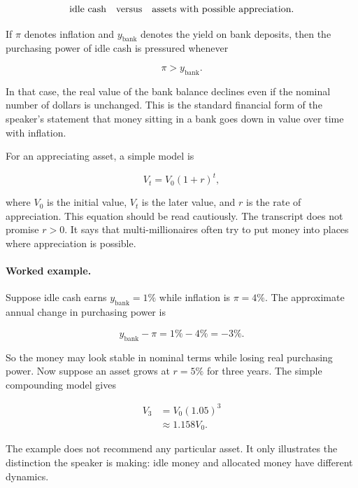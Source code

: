 \begin{equation}
\text{idle cash} \quad \hbox{versus} \quad \text{assets with possible appreciation}.
\end{equation}

If \(\pi\) denotes inflation and \(y_{\text{bank}}\) denotes the yield on bank deposits, then the purchasing power of idle cash is pressured whenever

\begin{equation}
\pi > y_{\text{bank}}.
\end{equation}

In that case, the real value of the bank balance declines even if the nominal number of dollars is unchanged. This is the standard financial form of the speaker's statement that money sitting in a bank goes down in value over time with inflation.

For an appreciating asset, a simple model is

\begin{equation}
V_t=V_0(1+r)^t,
\end{equation}

where \(V_0\) is the initial value, \(V_t\) is the later value, and \(r\) is the rate of appreciation. This equation should be read cautiously. The transcript does not promise \(r>0\). It says that multi-millionaires often try to put money into places where appreciation is possible.

\paragraph{Worked example.}
Suppose idle cash earns \(y_{\text{bank}}=1\%\) while inflation is \(\pi=4\%\). The approximate annual change in purchasing power is

\begin{equation}
y_{\text{bank}}-\pi = 1\%-4\%=-3\%.
\end{equation}

So the money may look stable in nominal terms while losing real purchasing power. Now suppose an asset grows at \(r=5\%\) for three years. The simple compounding model gives

\begin{align}
V_3 &= V_0(1.05)^3\\
    &\approx 1.158V_0.
\end{align}

The example does not recommend any particular asset. It only illustrates the distinction the speaker is making: idle money and allocated money have different dynamics.

